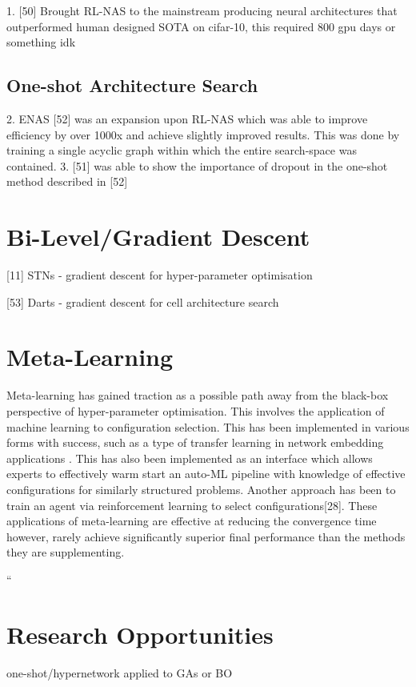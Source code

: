 \documentclass{article}
\begin{document}
    1. [50] Brought RL-NAS to the mainstream producing neural architectures that outperformed human designed SOTA on cifar-10, this required 800 gpu days or something idk
  
    \subsection{One-shot Architecture Search}
    2. ENAS [52] was an expansion upon RL-NAS which was able to improve efficiency by over 1000x and achieve slightly improved results. This was done by training a single acyclic graph within which the entire search-space was contained. 
    3. [51] was able to show the importance of dropout in the one-shot method described in [52] 




\section{Bi-Level/Gradient Descent}

	[11] STNs - gradient descent for hyper-parameter optimisation

	[53] Darts - gradient descent for cell architecture search  
    



\section{Meta-Learning}

	Meta-learning has gained traction as a possible path away from the black-box perspective of hyper-parameter optimisation. This involves the application of machine learning to configuration selection. This has been implemented in various forms with success, such as a type of transfer learning in network embedding applications \cite{9}. This has also been implemented as an interface which allows experts to effectively warm start an auto-ML pipeline with knowledge of effective configurations for similarly structured problems\cite{29}. Another approach has been to train an agent via reinforcement learning to select configurations[28]. These applications of meta-learning are effective at reducing the convergence time however, rarely achieve significantly superior final performance than the methods they are supplementing.\cite{31}\cite{29}

``


\section{Research Opportunities}

	one-shot/hypernetwork applied to GAs or BO



\printbibliography{}
\end{document}
